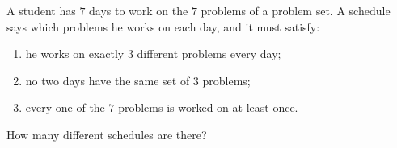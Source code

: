 A student has $7$ days to work on the $7$ problems of a problem set. A schedule says which problems he works on each day, and it must satisfy:
\begin{enumerate}
\item he works on exactly $3$ different problems every day;
\item no two days have the same set of $3$ problems;
\item every one of the $7$ problems is worked on at least once.
\end{enumerate}
How many different schedules are there?

